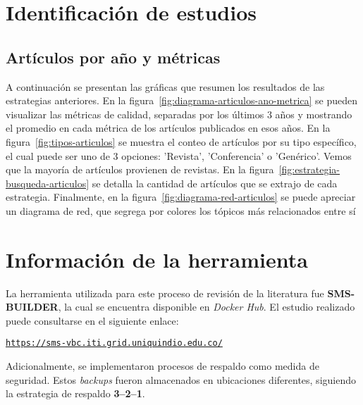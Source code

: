 \section{Identificación de estudios}

\subsection{Artículos por año y métricas}
A continuación se presentan las gráficas que resumen los resultados de las estrategias anteriores. En la figura~\ref{fig:diagrama-articulos-ano-metrica} se pueden visualizar las métricas de calidad, separadas por los últimos 3 años y mostrando el promedio en cada métrica de los artículos publicados en esos años. En la figura~\ref{fig:tipos-articulos} se muestra el conteo de artículos por su tipo específico, el cual puede ser uno de 3 opciones: 'Revista', 'Conferencia' o 'Genérico'. Vemos que la mayoría de artículos provienen de revistas. En la figura~\ref{fig:estrategia-busqueda-articulos} se detalla la cantidad de artículos que se extrajo de cada estrategia. Finalmente, en la figura~\ref{fig:diagrama-red-articulos} se puede apreciar un diagrama de red, que segrega por colores los tópicos más relacionados entre sí


\section{Información de la herramienta}

\noindent
La herramienta utilizada para este proceso de revisión de la literatura fue \textbf{SMS-BUILDER}, la cual se encuentra disponible en \textit{Docker Hub}. El estudio realizado puede consultarse en el siguiente enlace:

\begin{center}
\href{https://sms-vbc.iti.grid.uniquindio.edu.co/}{\texttt{https://sms-vbc.iti.grid.uniquindio.edu.co/}}
\end{center}

\noindent
Adicionalmente, se implementaron procesos de respaldo como medida de seguridad. Estos \textit{backups} fueron almacenados en ubicaciones diferentes, siguiendo la estrategia de respaldo \textbf{3--2--1}.
